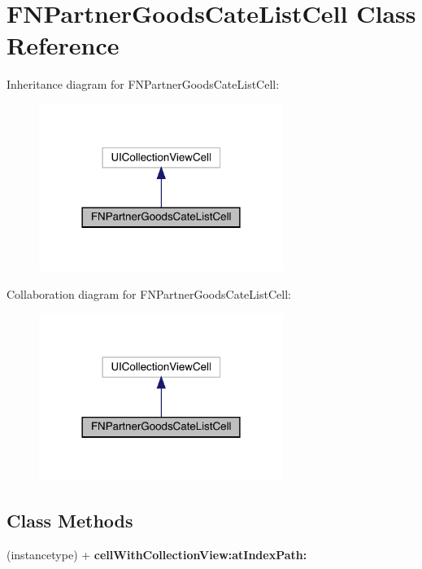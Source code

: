 \hypertarget{interface_f_n_partner_goods_cate_list_cell}{}\section{F\+N\+Partner\+Goods\+Cate\+List\+Cell Class Reference}
\label{interface_f_n_partner_goods_cate_list_cell}


Inheritance diagram for F\+N\+Partner\+Goods\+Cate\+List\+Cell\+:\nopagebreak
\begin{figure}[H]
\begin{center}
\leavevmode
\includegraphics[width=225pt]{interface_f_n_partner_goods_cate_list_cell__inherit__graph}
\end{center}
\end{figure}


Collaboration diagram for F\+N\+Partner\+Goods\+Cate\+List\+Cell\+:\nopagebreak
\begin{figure}[H]
\begin{center}
\leavevmode
\includegraphics[width=225pt]{interface_f_n_partner_goods_cate_list_cell__coll__graph}
\end{center}
\end{figure}
\subsection*{Class Methods}
\begin{DoxyCompactItemize}
\item 
\mbox{\label{interface_f_n_partner_goods_cate_list_cell_abc4ebe80014112f6b38ace11e039d51b}} 
(instancetype) + {\bfseries cell\+With\+Collection\+View\+:at\+Index\+Path\+:}
\end{DoxyCompactItemize}
